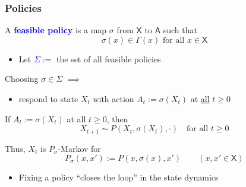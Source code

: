 \documentclass[xcolor=dvipsnames]{beamer}
\renewcommand{\geq}{\geqslant}
\newcommand{\navy}[1]{\textcolor{Blue}{\bf #1}}
\newcommand{\Asf}{\mathsf A}
\newcommand{\Xsf}{\mathsf X}
\renewcommand{\geq}{\geqslant}
\newcommand{\1}{\mathbbm 1}
\begin{document}
\begin{frame}
    \frametitle{Policies}

    
    A \navy{feasible policy} is a map $\sigma$ from $\Xsf$ to $\Asf$ such that
    \begin{equation*}
            \sigma(x) \in \Gamma(x) \text{ for all } x \in \Xsf
    \end{equation*}

    \begin{itemize}
        \item Let \navy{$\Sigma := $} the set of all feasible policies
    \end{itemize}

    \vspace{0.5em}
    \vspace{0.5em}
    \vspace{0.5em}

    Choosing $\sigma \in \Sigma$ $\implies$
    \begin{itemize}
        \item[] respond to state $X_t$ with action $A_t := \sigma(X_t)$ at 
        \underline{all} $t \geq 0$
    \end{itemize}



\end{frame}





\begin{frame}

    If $A_t := \sigma(X_t)$ at all $t \geq 0$, then
    \begin{equation*}
        X_{t+1} \sim P(X_t, \sigma(X_t), \cdot)
        \quad \text{for all $t \geq 0$}
    \end{equation*}

    \vspace{0.5em}
    Thus, $X_t$ is $P_\sigma$-Markov for
    \begin{equation*}
        P_\sigma(x, x') := P(x, \sigma(x), x')
        \qquad (x, x' \in \Xsf)
    \end{equation*}

    \vspace{0.5em}

    \begin{itemize}
        \item Fixing a policy ``closes the loop'' in the state dynamics
    \end{itemize}

\end{frame}
\end{document}

